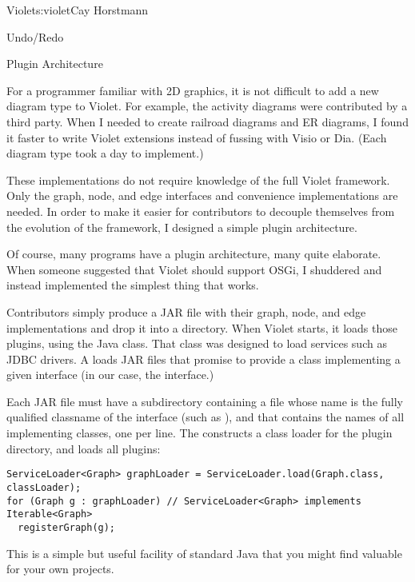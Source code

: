 \begin{aosachapter}{Violet}{s:violet}{Cay Horstmann}
\begin{aosasect1}{Undo/Redo}
\end{aosasect1}

\begin{aosasect1}{Plugin Architecture}

For a programmer familiar with 2D graphics, it is not difficult to add
a new diagram type to Violet. For example, the activity diagrams were
contributed by a third party. When I needed to create railroad
diagrams and ER diagrams, I found it faster to write Violet extensions
instead of fussing with Visio or Dia. (Each diagram type took a day to
implement.)

These implementations do not require knowledge of the full Violet
framework.  Only the graph, node, and edge interfaces and convenience
implementations are needed. In order to make it easier for
contributors to decouple themselves from the evolution of the
framework, I designed a simple plugin architecture.

Of course, many programs have a plugin architecture, many quite
elaborate.  When someone suggested that Violet should support OSGi, I
shuddered and instead implemented the simplest thing that works.

Contributors simply produce a JAR file with their graph, node, and
edge implementations and drop it into a  directory. When
Violet starts, it loads those plugins, using the Java
 class. That class was designed to load services
such as JDBC drivers. A  loads JAR files that
promise to provide a class implementing a given interface (in our
case, the  interface.)

Each JAR file must have a subdirectory 
containing a file whose name is the fully qualified classname of the
interface (such as ), and that
contains the names of all implementing classes, one per line.
The  constructs a class loader for the plugin
directory, and loads all plugins:

\begin{verbatim}
ServiceLoader<Graph> graphLoader = ServiceLoader.load(Graph.class, classLoader);
for (Graph g : graphLoader) // ServiceLoader<Graph> implements Iterable<Graph>
  registerGraph(g); 
\end{verbatim}

This is a simple but useful facility of standard Java that you might
find valuable for your own projects.

\end{aosasect1}


\end{aosachapter}
